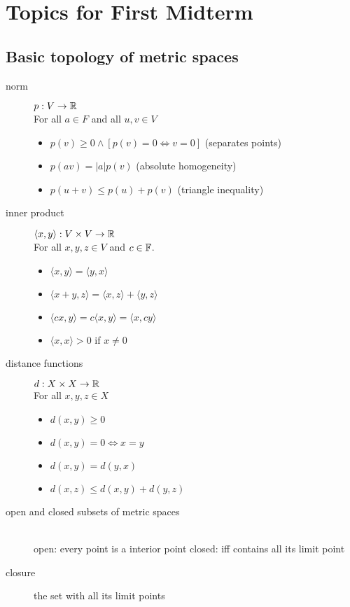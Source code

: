 \section{Topics for First Midterm}
\subsection{Basic topology of metric spaces}
\begin{description}
\item[norm] $p:V\to{\mathbb R}$\hfill\\
	For all $a\in F$ and all $u,v\in V$
	\begin{itemize}
	\item $p(v) \geq 0 \wedge [p(v) = 0 \iff v=0]$ (separates points)
	\item $p(av)=|a|p(v)$ (absolute homogeneity)
	\item $p(u + v) \leq p(u) + p(v)$ (triangle inequality)
	\end{itemize}
\item[inner product] $\langle x,y\rangle : V\times V \to {\mathbb R}$\hfill\\
	For all $x,y,z \in V$ and $c\in{\mathbb F}$.
	\begin{itemize}
	\item $\langle x,y\rangle = \langle y,x\rangle$
	\item $\langle x+y,z\rangle = \langle x,z\rangle + \langle y,z\rangle$
	\item $\langle cx,y\rangle = c\langle x,y\rangle = \langle x,cy\rangle$
	\item $\langle x,x\rangle > 0$ if $x\neq 0$
	\end{itemize}
\item[distance functions]$d: X \times X \to {\mathbb R}$ \hfill\\
	For all $x, y, z \in X$
	\begin{itemize}
	\item $d(x, y)\geq 0$
	\item $d(x, y) = 0 \iff x=y$
	\item $d(x, y) = d(y, x)$
	\item $d(x, z) \leq d(x, y) + d(y, z)$
	\end{itemize}
\item[open and closed subsets of metric spaces]\hfill\\
	open: every point is a interior point \newline
	closed: iff contains all its limit point
\item[closure]
	the set with all its limit points

\end{description}
